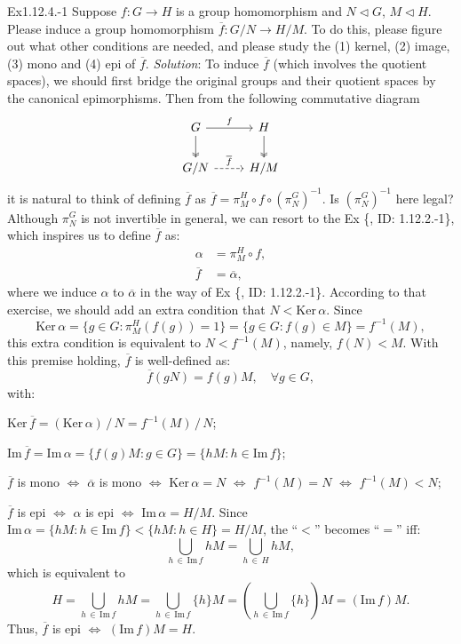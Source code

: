 \documentclass{article}
\newcommand{\nles}{\vartriangleleft}
\newcommand{\Ker}{\text{Ker}\,}
\newcommand{\Ima}{\text{Im}\,}
\begin{document}
\begin{Th}{Ex1.12.4.-1}
    Suppose $f: G\to H$ is a group homomorphism and $N\nles G$, $M\nles H$. Please induce a group homomorphism $\overline{f}: G/N\to H/M$. To do this, please figure out what other conditions are needed, and please study the (1) kernel, (2) image, (3) mono and (4) epi of $\overline{f}$.
    \tcblower
    \textit{Solution}: To induce $\overline{f}$ (which involves the quotient spaces), we should first bridge the original groups and their quotient spaces by the canonical epimorphisms. Then from the following commutative diagram
    $$ \begin{tikzcd}
        G \arrow[r, "f"] \arrow[d, two heads] & H \arrow[d, two heads] \\
        G/N \arrow[r, dashed, "\overline{f}"] & H/M
    \end{tikzcd} $$
    it is natural to think of defining $\overline{f}$ as $\overline{f} = \pi_M^H\circ f\circ(\pi_N^G)^{-1}$. Is $(\pi_N^G)^{-1}$ here legal? Although $\pi_N^G$ is not invertible in general, we can resort to the Ex \{, ID: 1.12.2.-1\}, which inspires us to define $\overline{f}$ as:
    $$ \begin{aligned}
        \alpha &= \pi_M^H\circ f, \\
        \overline{f} &= \overline{\alpha}, 
    \end{aligned} $$
    where we induce $\alpha$ to $\overline{\alpha}$ in the way of Ex \{, ID: 1.12.2.-1\}. According to that exercise, we should add an extra condition that $N<\Ker\alpha$. Since 
    $$ \Ker\alpha = \{g\in G: \pi_M^H(f(g)) = 1\} = \{g\in G: f(g)\in M\} = f^{-1}(M), $$
    this extra condition is equivalent to $N<f^{-1}(M)$, namely, \textcolor{P}{$f(N)<M$}. With this premise holding, $\overline{f}$ is well-defined as:
    $$ \overline{f}(gN) = f(g)M, \quad \forall g\in G, $$
    with:
    \begin{compactenum}
        \item $\Ker \overline{f} = (\Ker \alpha)\,/\,N = f^{-1}(M)\,/\,N$;
        \item $\Ima \overline{f} = \Ima \alpha = \{f(g)M: g\in G\} = \{hM: h\in\Ima f\}$;
        \item $\overline{f}$ is mono $\Longleftrightarrow$ $\overline{\alpha}$ is mono $\Longleftrightarrow$ $\Ker\alpha = N$ $\Longleftrightarrow$ $f^{-1}(M) = N$ $\Longleftrightarrow$ $f^{-1}(M) < N$;
        \item $\overline{f}$ is epi $\Longleftrightarrow$ $\alpha$ is epi $\Longleftrightarrow$ $\Ima\alpha = H/M$. Since $\Ima\alpha = \{hM: h\in\Ima f\} < \{hM: h\in H\} = H/M$, the ``$<$'' becomes ``$=$'' iff:
        $$ \bigcup_{h\,\in\,\Ima f} hM = \bigcup_{h\,\in\, H} hM, $$
        which is equivalent to
        $$ H = \bigcup_{h\,\in\, \Ima f} hM = \bigcup_{h\,\in\, \Ima f} \{h\} M = \left(\bigcup_{h\,\in\, \Ima f} \{h\}\right) M = (\Ima f) M. $$
        Thus, $\overline{f}$ is epi $\Longleftrightarrow$ $(\Ima f) M = H$.
    \end{compactenum}
\end{Th}
\end{document}
